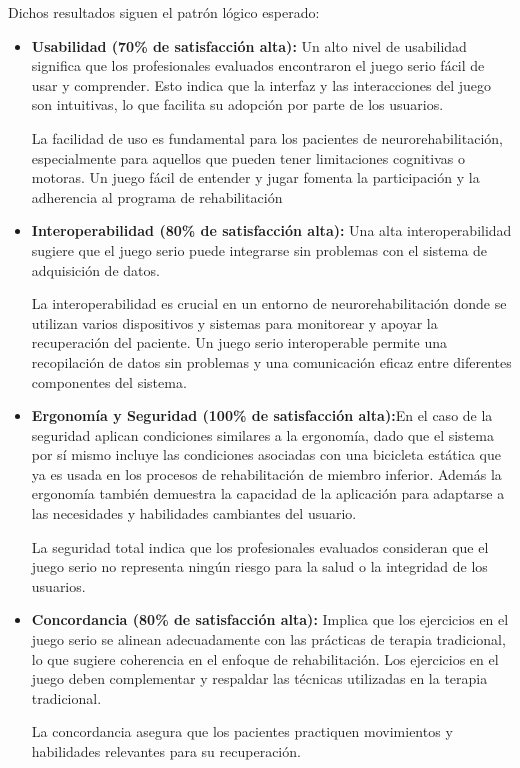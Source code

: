 Dichos resultados siguen el patrón lógico esperado:
\begin{itemize}
    \item \textbf{Usabilidad (70\% de satisfacción alta):} Un alto nivel de usabilidad significa que los profesionales evaluados encontraron el juego serio fácil de usar y comprender. Esto indica que la interfaz y las interacciones del juego son intuitivas, lo que facilita su adopción por parte de los usuarios.
    
    La facilidad de uso es fundamental para los pacientes de neurorehabilitación, especialmente para aquellos que pueden tener limitaciones cognitivas o motoras. Un juego fácil de entender y jugar fomenta la participación y la adherencia al programa de rehabilitación


    \item \textbf{Interoperabilidad (80\% de satisfacción alta):} Una alta interoperabilidad sugiere que el juego serio puede integrarse sin problemas con el sistema de adquisición de datos.
    
    La interoperabilidad es crucial en un entorno de neurorehabilitación donde se utilizan varios dispositivos y sistemas para monitorear y apoyar la recuperación del paciente. Un juego serio interoperable permite una recopilación de datos sin problemas y una comunicación eficaz entre diferentes componentes del sistema.


    \item \textbf{Ergonomía y Seguridad (100\% de satisfacción alta):}En el caso de la seguridad aplican condiciones similares a la ergonomía, dado que el sistema por sí mismo incluye las condiciones asociadas con una bicicleta estática que ya es usada en los procesos de rehabilitación de miembro inferior. Además la ergonomía también demuestra la capacidad de la aplicación para adaptarse a las necesidades y habilidades cambiantes del usuario. 
    
    La seguridad total indica que los profesionales evaluados consideran que el juego serio no representa ningún riesgo para la salud o la integridad de los usuarios.
    
    \item \textbf{Concordancia (80\% de satisfacción alta):} Implica que los ejercicios en el juego serio se alinean adecuadamente con las prácticas de terapia tradicional, lo que sugiere coherencia en el enfoque de rehabilitación. Los ejercicios en el juego deben complementar y respaldar las técnicas utilizadas en la terapia tradicional. 
    
    La concordancia asegura que los pacientes practiquen movimientos y habilidades relevantes para su recuperación.
\end{itemize}

